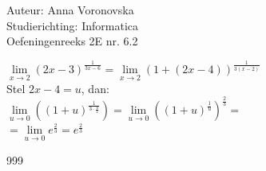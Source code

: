 \documentclass[a4paper]{article}
\begin{document}
  
\noindent \large Auteur: Anna Voronovska \\
\noindent \large Studierichting: Informatica\\
\noindent \large Oefeningenreeks 2E nr. 6.2\\

\medskip

\normalsize

$\lim\limits_{x \to 2} (2x-3)^{\tfrac{1}{3x-6}} = \lim\limits_{x \to 2} \left( 1 + (2x-4) \right)^{\tfrac{1}{3(x-2)}}$ \\

Stel $2x-4 = u$, dan: \\

$\lim\limits_{u \to 0} \left( (1 + u)^{\tfrac{1}{3 \cdot \tfrac{u}{2}}} \right) = \lim\limits_{u \to 0} \left( (1 + u)^{\tfrac{1}{u}} \right)^{\tfrac{2}{3}} =$ \\

$= \lim\limits_{u \to 0} e^{\tfrac{2}{3}} = e^{\tfrac{2}{3}}$\\

\begin{thebibliography}{999}
\end{thebibliography}
\end{document}
